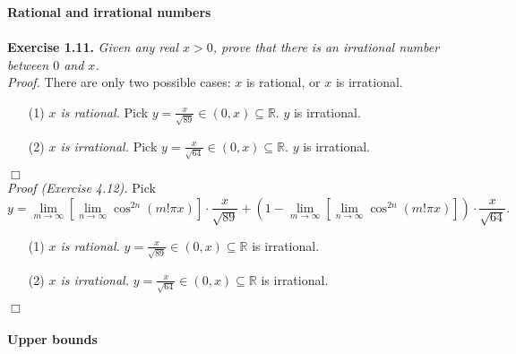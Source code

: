 \documentclass{article}
\begin{document}



\textbf{\large Rational and irrational numbers} \\\\



\textbf{Exercise 1.11.}
\emph{Given any real $x > 0$,
prove that there is an irrational number between $0$ and $x$.} \\

\emph{Proof.}
There are only two possible cases: $x$ is rational, or $x$ is irrational.
\begin{enumerate}
\item[(1)]
\emph{$x$ is rational.}
Pick $y = \frac{x}{\sqrt{89}} \in (0, x) \subseteq \mathbb{R}$. $y$ is irrational.
\item[(2)]
\emph{$x$ is irrational.}
Pick $y = \frac{x}{\sqrt{64}} \in (0, x) \subseteq \mathbb{R}$. $y$ is irrational.
\end{enumerate}
$\Box$ \\

\emph{Proof (Exercise 4.12).}
Pick
$$y
= \lim_{m \rightarrow \infty}[\lim_{n \rightarrow \infty} \cos^{2n}(m!\pi x)]
\cdot \frac{x}{\sqrt{89}}
+
(1 - \lim_{m \rightarrow \infty}[\lim_{n \rightarrow \infty} \cos^{2n}(m!\pi x)])
\cdot \frac{x}{\sqrt{64}}.$$
\begin{enumerate}
\item[(1)]
\emph{$x$ is rational.}
$y = \frac{x}{\sqrt{89}} \in (0, x) \subseteq \mathbb{R}$ is irrational.
\item[(2)]
\emph{$x$ is irrational.}
$y = \frac{x}{\sqrt{64}} \in (0, x) \subseteq \mathbb{R}$ is irrational.
\end{enumerate}
$\Box$ \\\\






\textbf{\large Upper bounds} \\\\



\end{document}
